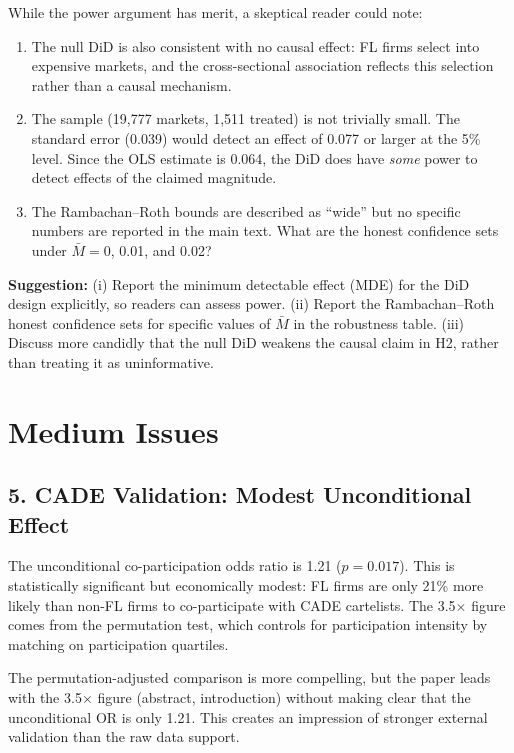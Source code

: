 \documentclass[12pt]{article}
\begin{document}
While the power argument has merit, a skeptical reader could note:

\begin{enumerate}[]
  \item The null DiD is also consistent with no causal effect: FL firms
    select into expensive markets, and the cross-sectional association
    reflects this selection rather than a causal mechanism.

  \item The sample (19,777 markets, 1,511 treated) is not trivially
    small. The standard error (0.039) would detect an effect of 0.077 or
    larger at the 5\% level. Since the OLS estimate is 0.064, the DiD
    does have \emph{some} power to detect effects of the claimed
    magnitude.

  \item The Rambachan--Roth bounds are described as ``wide'' but no
    specific numbers are reported in the main text. What are the honest
    confidence sets under $\bar{M} = 0$, 0.01, and 0.02?
\end{enumerate}

\noindent\textbf{Suggestion:} (i) Report the minimum detectable effect
(MDE) for the DiD design explicitly, so readers can assess power. (ii)
Report the Rambachan--Roth honest confidence sets for specific values of
$\bar{M}$ in the robustness table. (iii) Discuss more candidly that the
null DiD weakens the causal claim in H2, rather than treating it as
uninformative.


\section*{Medium Issues}

\subsection*{5. CADE Validation: Modest Unconditional Effect}

The unconditional co-participation odds ratio is 1.21 ($p = 0.017$).
This is statistically significant but economically modest: FL firms are
only 21\% more likely than non-FL firms to co-participate with CADE
cartelists. The 3.5$\times$ figure comes from the permutation test,
which controls for participation intensity by matching on participation
quartiles.

The permutation-adjusted comparison is more compelling, but the paper
leads with the 3.5$\times$ figure (abstract, introduction) without
making clear that the unconditional OR is only 1.21. This creates an
impression of stronger external validation than the raw data support.
\end{document}
